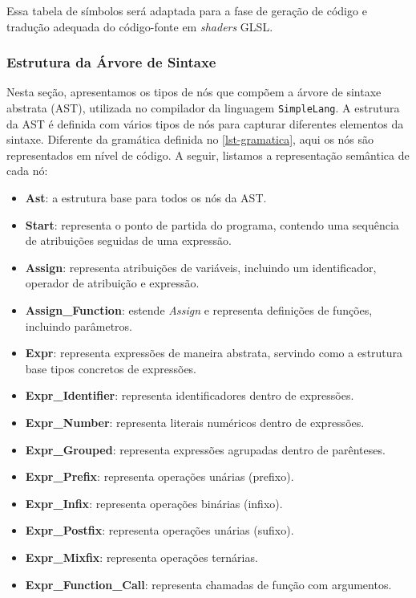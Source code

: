 \documentclass[english, 
               brazil, 
               bsc] %
               {dcomp-abntex2}
\begin{document}
Essa tabela de símbolos será adaptada para a fase de geração de código e tradução adequada do código-fonte em \textit{shaders} GLSL.




\subsubsection{Estrutura da Árvore de Sintaxe}
Nesta seção, apresentamos os tipos de nós que compõem a árvore de sintaxe abstrata (AST), utilizada no compilador da linguagem \texttt{SimpleLang}. A estrutura da AST é definida com vários tipos de nós para capturar diferentes elementos da sintaxe. Diferente da gramática definida no \autoref{lst-gramatica}, aqui os nós são representados em nível de código. A seguir, listamos a representação semântica de cada nó:


\begin{itemize}
\item \textbf{Ast}: a estrutura base para todos os nós da AST.
\item \textbf{Start}: representa o ponto de partida do programa, contendo uma sequência de atribuições seguidas de uma expressão.
\item \textbf{Assign}: representa atribuições de variáveis, incluindo um identificador, operador de atribuição e expressão.
\item \textbf{Assign\_Function}: estende \textit{Assign} e representa definições de funções, incluindo parâmetros.
\item \textbf{Expr}: representa expressões de maneira abstrata, servindo como a estrutura base tipos concretos de expressões.
\item \textbf{Expr\_Identifier}: representa identificadores dentro de expressões.
\item \textbf{Expr\_Number}: representa literais numéricos dentro de expressões.
\item \textbf{Expr\_Grouped}: representa expressões agrupadas dentro de parênteses.
\item \textbf{Expr\_Prefix}: representa operações unárias (prefixo).
\item \textbf{Expr\_Infix}: representa operações binárias (infixo).
\item \textbf{Expr\_Postfix}: representa operações unárias (sufixo).
\item \textbf{Expr\_Mixfix}: representa operações ternárias.
\item \textbf{Expr\_Function\_Call}: representa chamadas de função com argumentos.


\end{itemize}
\end{document}
